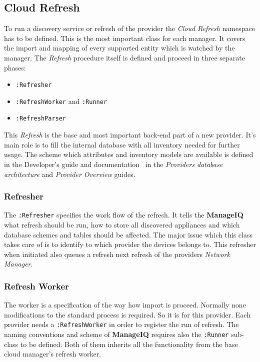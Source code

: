\clearpage
\subsection{Cloud Refresh}
\label{sub:Cloud Refresh}

To run a discovery service or refresh of the provider the \emph{Cloud Refresh} namespace has to be defined. This is the most important class for each manager. It covers the import and mapping of every supported entity which is watched by the manager. The \emph{Refresh} procedure itself is defined and proceed in three separate phases:

\begin{itemize}
	\item \verb|:Refresher|
	\item \verb|:RefreshWorker| and \verb|:Runner|
	\item \verb|:RefreshParser|
\end{itemize}

This \emph{Refresh} is the base and most important back-end part of a new provider. It's main role is to fill the internal database with all inventory needed for further usage. The scheme which attributes and inventory models are available is defined in the Developer's guide and documentation~\cite{manageiq_dev} in the \emph{Providers database architecture} and \emph{Provider Overview} guides.

\subsubsection{Refresher}
\label{subs:Refresher}

The \verb|:Refresher| specifies the work flow of the refresh. It tells the \textbf{ManageIQ} what refresh should be run, how to store all discovered appliances and which database schemes and tables should be affected. The major issue which this class takes care of is to identify to which provider the devices belongs to. This refresher when initiated also queues a refresh next refresh of the providers \emph{Network Manager}.

\subsubsection{Refresh Worker}
\label{subs:Refresh Worker}

The worker is a specification of the way how import is proceed. Normally none modifications to the standard process is required. So it is for this provider. Each provider needs a \verb|:RefreshWorker| in order to register the run of refresh. The naming conventions and scheme of \textbf{ManageIQ} requires also the \verb|:Runner| sub-class to be defined. Both of them inherits all the functionality from the base cloud manager's refresh worker.

